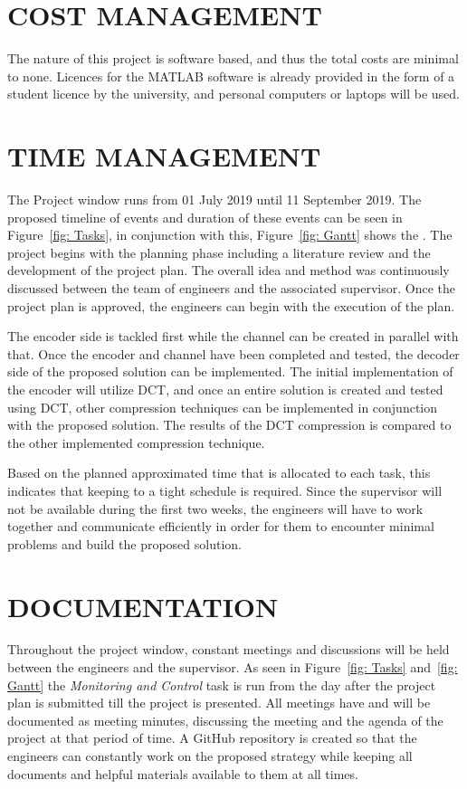 \documentclass[10pt,twocolumn, a4paper]{witseiepaper}
\begin{document}
\section{COST MANAGEMENT}
\label{sec: Cost Management}
The nature of this project is software based, and thus the total costs are minimal to none. Licences for the MATLAB software is already provided in the form of a student licence by the university, and personal computers or laptops will be used.

%
\section{TIME MANAGEMENT}
\label{sec: Time Management}
The Project window runs from 01 July 2019 until 11 September 2019. The proposed timeline of events and duration of these events can be seen in Figure~\ref{fig: Tasks}, in conjunction with this, Figure~\ref{fig: Gantt} shows the . The project begins with the planning phase including a literature review and the development of the project plan. The overall idea and method was continuously discussed between the team of engineers and the associated supervisor. Once the project plan is approved, the engineers can begin with the execution of the plan.

The encoder side is tackled first while the channel can be created in parallel with that. Once the encoder and channel have been completed and tested, the decoder side of the proposed solution can be implemented. The initial implementation of the encoder will utilize DCT, and once an entire solution is created and tested using DCT, other compression techniques can be implemented in conjunction with the proposed solution. The results of the DCT compression is compared to the other implemented compression technique.

Based on the planned approximated time that is allocated to each task, this indicates that keeping to a tight schedule is required. Since the supervisor will not be available during the first two weeks, the engineers will have to work together and communicate efficiently in order for them to encounter minimal problems and build the proposed solution.

%
\section{DOCUMENTATION}
\label{sec: Documentation}
Throughout the project window, constant meetings and discussions will be held between the engineers and the supervisor. As seen in Figure~\ref{fig: Tasks} and~\ref{fig: Gantt} the \emph{Monitoring and Control} task is run from the day after the project plan is submitted till the project is presented. All meetings have and will be documented as meeting minutes, discussing the meeting and the agenda of the project at that period of time. A GitHub repository is created so that the engineers can constantly work on the proposed strategy while keeping all documents and helpful materials available to them at all times.
\end{document}
